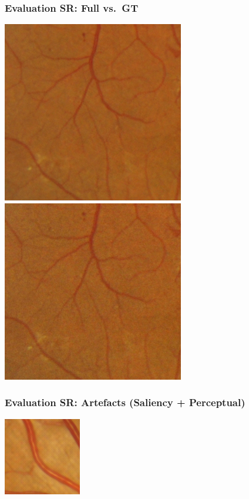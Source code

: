 \documentclass{beamer}
\begin{document}
\begin{frame} \frametitle{Evaluation SR: Full vs.\ GT }
\includegraphics[width=0.48\linewidth]{patch_sr1_gan}\quad
\includegraphics[width=0.48\linewidth]{patch_sr1_gt}
\end{frame}

\begin{frame} \frametitle{Evaluation SR: Artefacts (Saliency + Perceptual) }
  \centering
\includegraphics[width=0.7\linewidth]{patch_sr1_sal_perc_small}
\end{frame}
\end{document}
